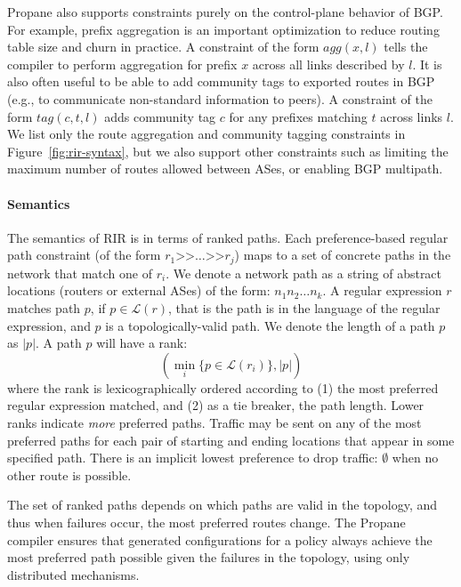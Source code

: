 \documentclass[10pt]{sigalternate052015}
\newcommand{\sysname}{{\small \sf Propane}\xspace}
\newcommand{\para}[1]{\paragraph*{\textbf{#1}}}
\newcommand{\set}[1]{\ensuremath{\{ #1 \} }}
\newcommand{\abs}[1]{\ensuremath{ \lvert #1 \rvert }}
\newcommand{\KW}[1]{\texttt{\small\bfseries{#1}}}
\newcommand{\Prefer}{\texttt{>>}}
\newcommand{\Link}{\texttt{->}}
\newcommand{\Agg}{\KW{agg}}
\newcommand{\In}{\KW{in}}
\newcommand{\Out}{\KW{out}}
\begin{document}
\sysname also supports constraints purely on the control-plane behavior of BGP. For example, prefix aggregation is an important optimization to reduce routing table size and churn in practice. A constraint of the form $agg(x,l)$ tells the compiler to perform aggregation for prefix $x$ across all links described by $l$. It is also often useful to be able to add community tags to exported routes in BGP (e.g., to communicate non-standard information to peers). A constraint of the form $tag(c,t,l)$ adds community tag $c$ for any prefixes matching $t$ across links $l$.
We list only the route aggregation and community tagging constraints in Figure~\ref{fig:rir-syntax}, but we also support other constraints such as limiting the maximum number of routes allowed between ASes, or enabling BGP multipath.


\para{Semantics}

The semantics of RIR is in terms of ranked paths. Each preference-based regular path constraint (of the form $r_1 \Prefer \dots \Prefer r_j$) maps to a set of concrete paths in the network that match one of $r_i$. We denote a network path as a string of abstract locations (routers or external ASes) of the form: $n_1 n_2 \dots n_k$. A regular expression $r$ matches path $p$, if $p \in \mathcal{L}(r)$, that is the path is in the language of the regular expression, and $p$ is a topologically-valid path. We denote the length of a path $p$ as $\abs{p}$. A path $p$ will have a rank:
$$(\min_i \set{ p \in \mathcal{L}(r_i) }, \abs{p})$$
where the rank is lexicographically ordered according to (1) the most preferred regular expression matched, and (2) as a tie breaker, the path length. Lower ranks indicate \emph{more} preferred paths. Traffic may be sent on any of the most preferred paths for each pair of starting and ending locations that appear in some specified path. There is an implicit lowest preference to drop traffic: $\emptyset$ when no other route is possible.

The set of ranked paths depends on which paths are valid in the topology, and thus when failures occur, the most preferred routes change. The \sysname compiler ensures that generated configurations for a policy always achieve the most preferred path possible given the failures in the topology, using only distributed mechanisms.
\end{document}
